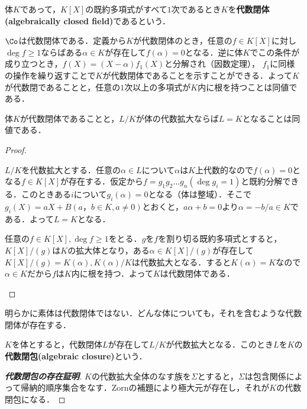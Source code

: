 \begin{defi}[代数閉体]
	体$K$であって，$K[X]$の既約多項式がすべて$1$次であるとき$K$を\textbf{代数閉体(algebraically closed field)}であるという．
\end{defi}

$\Co$は代数閉体である．定義から$K$が代数閉体のとき，任意の$f\in K[X]$に対し$\deg f\geq1$ならばある$\alpha\in K$が存在して$f(\alpha)=0$となる．逆に体$K$でこの条件が成り立つとき，$f(X)=(X-\alpha)f_1(X)$と分解され（因数定理）， $f_1$に同様の操作を繰り返すことで$K$が代数閉体であることを示すことができる．よって$K$が代数閉であることと，任意の$1$次以上の多項式が$K$内に根を持つことは同値である．

\begin{prop}
	体$K$が代数閉体であることと，$L/K$が体の代数拡大ならば$L=K$となることは同値である．
\end{prop}

\begin{proof}
	\begin{eqv}
		\item $L/K$を代数拡大とする．任意の$\alpha\in L$について$\alpha$は$K$上代数的なので$f(\alpha)=0$となる$f\in K[X]$が存在する．仮定から$f=g_1g_2\dots g_n (\deg g_i=1)$と既約分解できる．このときある$i$について$g_i(\alpha)=0$となる（体は整域）．そこで$g_i(X)=aX+B (a，b\in K, a\neq0)$とおくと，$a\alpha+b=0$より$\alpha=-b/a\in K$である．よって$L=K$となる．
	
	\item 任意の$f\in K[X],\deg f\geq1$をとる．$g$を$f$を割り切る既約多項式とすると，$K[X]/(g)$は$K$の拡大体となり，ある$\alpha\in K[X]/(g)$が存在して$K[X]/(g)=K(\alpha),K(\alpha)/K$は代数拡大となる．すると$K(\alpha)=K$なので$\alpha\in K$だから$f$は$K$内に根を持つ．よって$K$は代数閉体である．
	\end{eqv}
\end{proof}

明らかに素体は代数閉体ではない．どんな体についても，それを含むような代数閉体が存在する．

\begin{defi}[代数閉包]
	$K$を体とすると，代数閉体$L$が存在して$L/K$が代数拡大となる．このとき$L$を$K$の\textbf{代数閉包(algebraic closure)}という．
\end{defi}

\begin{proof}[\textbf{代数閉包の存在証明}]
	$K$の代数拡大全体のなす族を$\Sigma$とすると，$\Sigma$は包含関係によって帰納的順序集合をなす．Zornの補題により極大元が存在し，それが$K$の代数閉包になる．
\end{proof}

